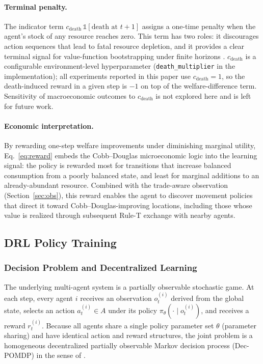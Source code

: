\documentclass[pdflatex,sn-mathphys-num]{sn-jnl}%
\theoremstyle{thmstyleone}%
\theoremstyle{thmstyletwo}%
\theoremstyle{thmstylethree}%
\begin{document}
\paragraph{Terminal penalty.}
The indicator term $c_{\text{death}}\,\mathbb{1}[\text{death at }t{+}1]$ assigns a one-time penalty when the agent's stock of any resource reaches zero.  
This term has two roles: it discourages action sequences that lead to fatal resource depletion, and it provides a clear terminal signal for value-function bootstrapping under finite horizons \citep{Ng1999, Sert2020}.  
$c_{\text{death}}$ is a configurable environment-level hyperparameter (\texttt{death\_multiplier} in the implementation); all experiments reported in this paper use $c_{\text{death}} = 1$, so the death-induced reward in a given step is $-1$ on top of the welfare-difference term.  
Sensitivity of macroeconomic outcomes to $c_{\text{death}}$ is not explored here and is left for future work.

\paragraph{Economic interpretation.}
By rewarding one-step welfare improvements under diminishing marginal utility, Eq.~\eqref{eq:reward} embeds the Cobb--Douglas microeconomic logic into the learning signal: the policy is rewarded most for transitions that increase balanced consumption from a poorly balanced state, and least for marginal additions to an already-abundant resource.  
Combined with the trade-aware observation (Section~\ref{sec:obs}), this reward enables the agent to discover movement policies that direct it toward Cobb--Douglas-improving locations, including those whose value is realized through subsequent Rule-T exchange with nearby agents.

\subsection{DRL Policy Training}
\subsubsection{Decision Problem and Decentralized Learning}
\label{sec:mdp}

The underlying multi-agent system is a partially observable stochastic game.  
At each step, every agent $i$ receives an observation $o_t^{(i)}$ derived from the global state, selects an action $a_t^{(i)} \in A$ under its policy $\pi_\theta(\cdot \mid o_t^{(i)})$, and receives a reward $r_t^{(i)}$.  
Because all agents share a single policy parameter set $\theta$ (parameter sharing) and have identical action and reward structures, the joint problem is a homogeneous decentralized partially observable Markov decision process (Dec-POMDP) in the sense of \citet{OliehoekAmato2016}.
\end{document}
